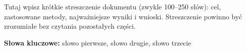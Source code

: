 
Tutaj wpisz krótkie streszczenie dokumentu (zwykle 100--250 słów): cel, zastosowane metody,
najważniejsze wyniki i wnioski. Streszczenie powinno być zrozumiałe bez czytania pozostałych części.

\medskip
\noindent\textbf{Słowa kluczowe:} słowo pierwsze, słowo drugie, słowo trzecie
